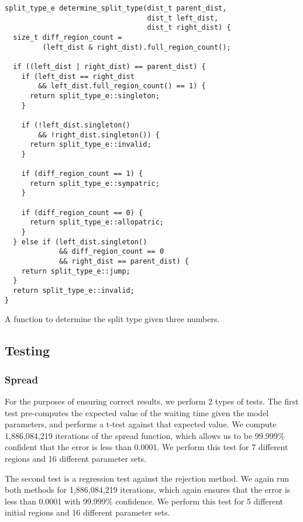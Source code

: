 \documentclass{article}
\begin{document}
\begin{listing}
	\begin{verbatim}
split_type_e determine_split_type(dist_t parent_dist, 
                                  dist_t left_dist, 
                                  dist_t right_dist) {
  size_t diff_region_count =
         (left_dist & right_dist).full_region_count();

  if ((left_dist | right_dist) == parent_dist) {
    if (left_dist == right_dist 
        && left_dist.full_region_count() == 1) {
      return split_type_e::singleton;
    }

    if (!left_dist.singleton() 
        && !right_dist.singleton()) {
      return split_type_e::invalid;
    }

    if (diff_region_count == 1) {
      return split_type_e::sympatric;
    }

    if (diff_region_count == 0) {
      return split_type_e::allopatric;
    }
  } else if (left_dist.singleton()
             && diff_region_count == 0
             && right_dist == parent_dist) {
    return split_type_e::jump;
  }
  return split_type_e::invalid;
}
\end{verbatim}
	\caption{A function to determine the split type given three numbers.}
	\label{lst:determine-split-type}
\end{listing}

\subsection{Testing}

\subsubsection{Spread}

For the purposes of ensuring correct results, we perform 2 types of tests.
The first test pre-computes the expected value of the waiting time given the
model parameters, and performs a t-test against that expected value.
We compute 1,886,084,219 iterations of the spread function, which allows us to
be 99.999\% confident that the error is less than 0.0001.
We perform this test for 7 different regions and 16 different parameter sets.

The second test is a regression test against the rejection method.
We again run both methods for 1,886,084,219 iterations, which again ensures
that the error is less than 0.0001 with 99.999\% confidence.
We perform this test for 5 different initial regions and 16 different parameter
sets.
\end{document}
